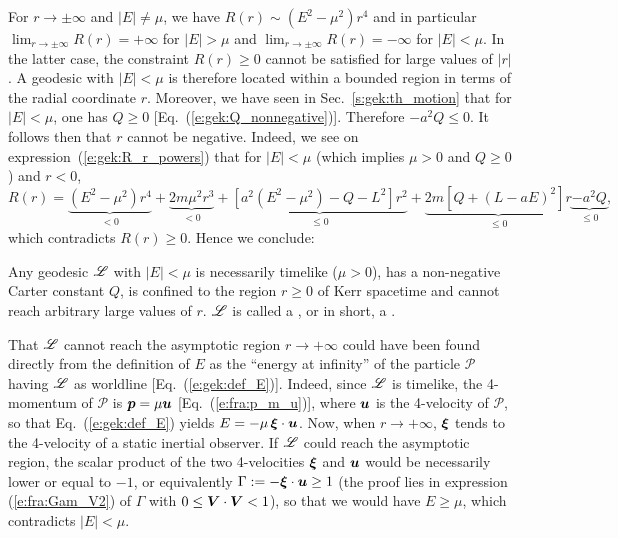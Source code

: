 For $r\to \pm\infty$ and $|E|\neq \mu$,
we have $R(r) \sim (E^2 - \mu^2) r^4$ and in
particular $\lim_{r\to\pm\infty} R(r) = + \infty$ for $|E|>\mu$
and $\lim_{r\to\pm\infty} R(r) = - \infty$ for $|E|<\mu$. In the latter case,
the constraint $R(r) \geq 0$ cannot be satisfied for large values
of $|r|$. A geodesic with $|E|<\mu$ is therefore located within a bounded
region in terms of the radial coordinate $r$. Moreover, we have seen in
Sec.~\ref{s:gek:th_motion} that for $|E|<\mu$, one has $Q\geq 0$
[Eq.~(\ref{e:gek:Q_nonnegative})]. Therefore $-a^2 Q \leq 0$.
It follows then that $r$ cannot be negative.
Indeed, we see
on expression~(\ref{e:gek:R_r_powers}) that for $|E|<\mu$ (which implies $\mu>0$ and $Q\geq 0$) and $r<0$,
\[
    R(r) = \underbrace{(E^2 - \mu^2) r^4}_{<0} + \underbrace{2 m \mu^2 r^3}_{<0}
     + \underbrace{\left[ a^2 (E^2 - \mu^2) - Q - L^2 \right] r^2}_{\leq 0}
     + \underbrace{2m\left[ Q + (L - a E)^2 \right] r}_{\leq 0}
     \underbrace{-a^2 Q}_{\leq 0} ,
\]
which contradicts $R(r)\geq 0$.
Hence we conclude:
\begin{greybox}
Any geodesic $\mathscr{L}$ with $|E|<\mu$ is necessarily timelike ($\mu >0$),
has a non-negative Carter constant $Q$,
is confined to the region $r\geq 0$ of Kerr spacetime
and cannot reach arbitrary large values of $r$. $\mathscr{L}$ is called a
,
or in short, a .
\end{greybox}
\begin{remark} \label{r:gek:bound_geod}
That $\mathscr{L}$
cannot reach the asymptotic region $r\to +\infty$ could have been
found directly from the definition of $E$ as the ``energy at infinity''
of the particle $\mathscr{P}$ having $\mathscr{L}$ as worldline
[Eq.~(\ref{e:gek:def_E})]. Indeed, since $\mathscr{L}$ is timelike, the 4-momentum
of $\mathscr{P}$ is $\bm{p} = \mu \bm{u}$ [Eq.~(\ref{e:fra:p_m_u})], where
$\bm{u}$ is the 4-velocity of $\mathscr{P}$, so that Eq.~(\ref{e:gek:def_E})
yields $E = - \mu\, \bm{\xi}\cdot\bm{u}$. Now, when $r\to +\infty$, $\bm{\xi}$
tends to the 4-velocity of a static inertial observer.
If $\mathscr{L}$ could reach the asymptotic region,
the scalar
product of the two 4-velocities $\bm{\xi}$ and
$\bm{u}$ would be necessarily lower or equal to $-1$, or equivalently
$\Gamma := - \bm{\xi}\cdot\bm{u} \geq 1$ (the proof lies in expression
(\ref{e:fra:Gam_V2}) of $\Gamma$ with $0\leq \bm{V}\cdot\bm{V} < 1$), so that
we would have $E \geq \mu$, which contradicts $|E|<\mu$.
\end{remark}

